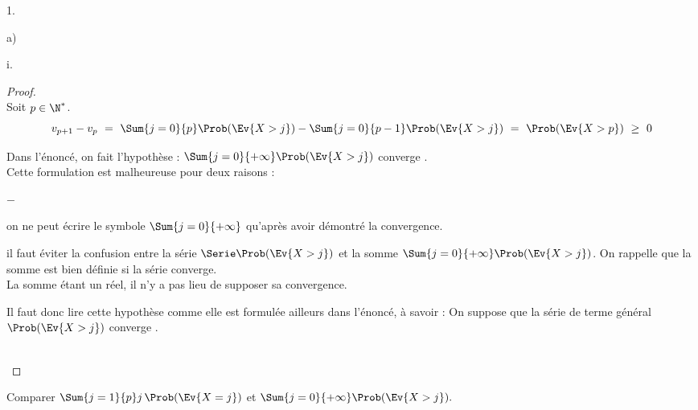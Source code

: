 \begin{noliste}{1.}
\begin{noliste}{a)}
\begin{nonoliste}{i.}
      \begin{proof}~\\%
        Soit $p \in \N^*$.
        \[
        v_{p+1} - v_p \ = \ \Sum{j = 0}{p} \Prob(\Ev{X > j}) - \Sum{j
          = 0}{p - 1} \Prob(\Ev{X > j}) \ = \ \Prob(\Ev{X > p}) \ \geq
        \ 0
        \]
        \begin{remark}%
          Dans l'énoncé, on fait l'hypothèse : \og $\Sum{j=0}{+\infty}
          \Prob(\Ev{X >j})$ converge \fg{}.\\
          Cette formulation est malheureuse pour deux raisons :
          \begin{noliste}{$-$}
          \item on ne peut écrire le symbole $\Sum{j=0}{+\infty}$
            qu'après avoir démontré la convergence.\\[-.4cm]
          \item il faut éviter la confusion entre la série $\Serie
            \Prob(\Ev{X >j})$ et la somme $\Sum{j=0}{+\infty}
            \Prob(\Ev{X >j})$. On rappelle que la somme est bien
            définie si la série converge.\\
            La somme étant un réel, il n'y a pas lieu de supposer sa
            convergence.
          \end{noliste}
          Il faut donc lire cette hypothèse comme elle est formulée
          ailleurs dans l'énoncé, à savoir : \og On suppose que la
          série de terme général $\Prob(\Ev{X > j})$ converge \fg{}.
        \end{remark}~\\[-1.4cm]
      \end{proof}

    \item Comparer $\Sum{j=1}{p} j \, \Prob(\Ev{X =j})$ et
      $\Sum{j=0}{+\infty} \Prob(\Ev{X >j}).$
    \end{nonoliste}


\end{noliste}
\end{noliste}
